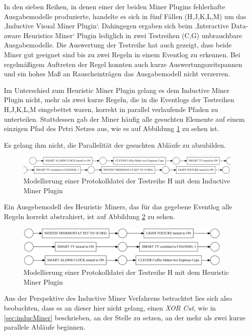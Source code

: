 In den sieben Reihen, in denen einer der beiden Miner Plugins fehlerhafte Ausgabemodelle produzierte, handelte es sich in fünf Fällen (H,J,K,L,M) um das ‚Inductive Visual Miner Plugin‘. Dahingegen ergaben sich beim ‚Interactive Data-aware Heuristics Miner‘ Plugin lediglich in zwei Testreihen (C,G) unbrauchbare Ausgabemodelle. Die Auswertung der Testreihe hat auch gezeigt, dass beide Miner gut geeignet sind bis zu zwei Regeln in einem Eventlog zu erkennen. Bei regelmäßigem Auftreten der Regel konnten auch kurze Auswertungszeitspannen und ein hohes Maß an Rauscheinträgen das Ausgabemodell nicht verzerren.

Im Unterschied zum Heuristic Miner Plugin gelang es dem Inductive Miner Plugin nicht, mehr als zwei kurze Regeln, die in die Eventlogs der Testreihen H,J,K,L,M eingebettet waren, korrekt in parallel verlaufende Pfaden zu unterteilen. Stattdessen gab der Miner häufig alle gesuchten Elemente auf einem einzigen Pfad des Petri Netzes aus, wie es auf Abbildung \ref{fig:H_inductive} zu sehen ist. 

Es gelang ihm nicht, die Parallelität der gesuchten Abläufe zu abzubilden. 


\begin{figure}[!ht]
    \centering
    \includegraphics[width=\textwidth,]{figures/Appbildungen/H_induct.PNG}
    \caption{Modellierung einer Protokolldatei der Testreihe H mit dem Inductive Miner Plugin}
    \label{fig:H_inductive}
\end{figure}

Ein Ausgebemodell des Heuristic Miners, das für das gegebene Eventlog alle Regeln korrekt abstrahiert, ist auf Abbildung \ref{fig:H_heurist} zu sehen.


\begin{figure}[!ht]
    \centering
    \includegraphics[width=0.95\textwidth,]{figures/Appbildungen/H_heurist.PNG}
    \caption{Modellierung einer Protokolldatei der Testreihe H mit dem Heuristic Miner Plugin}
    \label{fig:H_heurist}
\end{figure}

Aus der Perspektive des Inductive Miner Verfahrens betrachtet lies sich also beobachten, dass es an dieser hier nicht gelang, einen \textit{XOR Cut}, wie in  \ref{sec:inducMiner} beschrieben, an der Stelle zu setzen, an der mehr als zwei kurze parallele Abläufe beginnen. 

